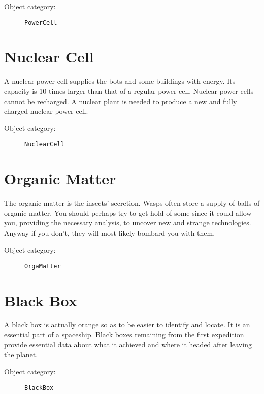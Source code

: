 \begin{description}
    \item[Object category:] \texttt{PowerCell}
\end{description}


\section{Nuclear Cell}

A nuclear power cell supplies the bots and some buildings with energy. Its capacity is 10 times larger than that of a regular power cell. Nuclear power cells cannot be recharged. A nuclear plant is needed to produce a new and fully charged nuclear power cell.

\begin{description}
    \item[Object category:] \texttt{NuclearCell}
\end{description}


\section{Organic Matter}

The organic matter is the insects' secretion. Wasps often store a supply of balls of organic matter. You should perhaps try to get hold of some since it could allow you, providing the necessary analysis, to uncover new and strange technologies. Anyway if you don't, they will most likely bombard you with them.

\begin{description}
    \item[Object category:] \texttt{OrgaMatter}
\end{description}


\section{Black Box}

A black box is actually orange so as to be easier to identify and locate. It is an essential part of a spaceship. Black boxes remaining from the first expedition provide essential data about what it achieved and where it headed after leaving the planet.

\begin{description}
    \item[Object category:] \texttt{BlackBox}
\end{description}

